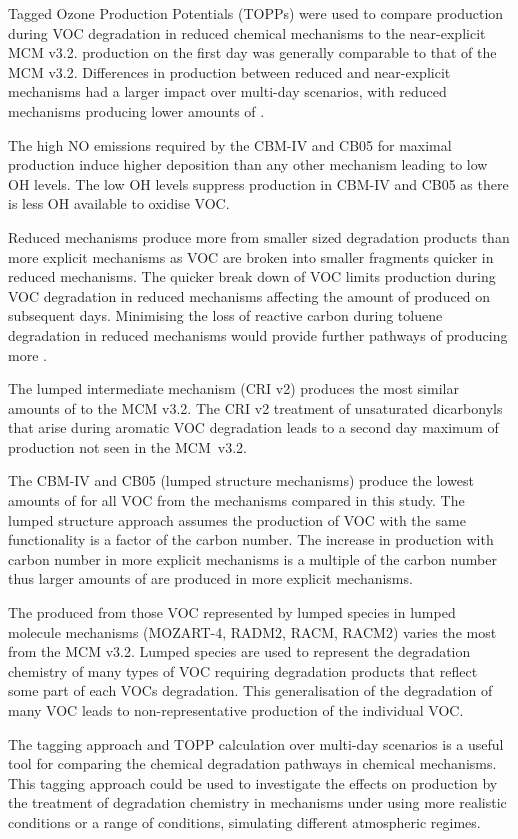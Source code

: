 Tagged Ozone Production Potentials (TOPPs) were used to compare  production during VOC degradation in reduced chemical mechanisms to the near-explicit MCM v3.2. 
 production on the first day was generally comparable to that of the MCM v3.2.
Differences in  production between reduced and near-explicit mechanisms had a larger impact over multi-day scenarios, with reduced mechanisms producing lower amounts of .

The high NO emissions required by the CBM-IV and CB05 for maximal  production induce higher  deposition than any other mechanism leading to low OH levels.
The low OH levels suppress  production in CBM-IV and CB05 as there is less OH available to oxidise VOC.

Reduced mechanisms produce more  from smaller sized degradation products than more explicit mechanisms as VOC are broken into smaller fragments quicker in reduced mechanisms.
The quicker break down of VOC limits  production during VOC degradation in reduced mechanisms affecting the amount of  produced on subsequent days.
Minimising the loss of reactive carbon during toluene degradation in reduced mechanisms would provide further pathways of producing more .

The lumped intermediate mechanism (CRI v2) produces the most similar amounts of  to the MCM v3.2.
The CRI v2 treatment of unsaturated dicarbonyls that arise during aromatic VOC degradation leads to a second day maximum of  production not seen in the \mbox{MCM v3.2}.

The CBM-IV and CB05 (lumped structure mechanisms) produce the lowest amounts of  for all VOC from the mechanisms compared in this study.
The lumped structure approach assumes the  production of VOC with the same functionality is a factor of the carbon number.
The increase in  production with carbon number in more explicit mechanisms is a multiple of the carbon number thus larger amounts of  are produced in more explicit mechanisms.

The  produced from those VOC represented by lumped species in lumped molecule mechanisms (MOZART-4, RADM2, RACM, RACM2) varies the most from the MCM v3.2.
Lumped species are used to represent the degradation chemistry of many types of VOC requiring degradation products that reflect some part of each VOCs degradation.
This generalisation of the degradation of many VOC leads to non-representative  production of the individual VOC.

The tagging approach and TOPP calculation over multi-day scenarios is a useful tool for comparing the chemical degradation pathways in chemical mechanisms. 
This tagging approach could be used to investigate the effects on  production by the treatment of degradation chemistry in mechanisms under using more realistic  conditions or a range of  conditions, simulating different atmospheric regimes. 
